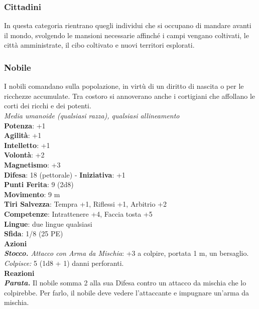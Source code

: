 \begin{multicols}{2}
\subsubsection{Cittadini}

In questa categoria rientrano quegli individui che si occupano di mandare avanti il mondo, svolgendo le mansioni necessarie affinché i campi vengano coltivati, le città amministrate, il cibo coltivato e nuovi territori esplorati.

\subsubsection{Nobile}

I nobili comandano sulla popolazione, in virtù di un diritto di nascita o per le ricchezze accumulate. Tra costoro si annoverano anche i cortigiani che affollano le corti dei ricchi e dei potenti.\\
\emph{Media umanoide (qualsiasi razza), qualsiasi allineamento}\\
\textbf{Potenza}: +1\\
\textbf{Agilità}: +1\\
\textbf{Intelletto}: +1\\
\textbf{Volontà}: +2\\
\textbf{Magnetismo}: +3\\
\textbf{Difesa}: 18 (pettorale) - \textbf{Iniziativa}: +1\\
\textbf{Punti Ferita}: 9 (2d8)\\
\textbf{Movimento}: 9 m\\
\textbf{Tiri Salvezza}: Tempra +1, Riflessi +1, Arbitrio +2 \\
\textbf{Competenze}: Intrattenere +4, Faccia tosta +5\\
\textbf{Lingue}: due lingue qualsiasi\\
\textbf{Sfida}: 1/8 (25 PE)\smallskip\\
\smallskip\textbf{Azioni}\\
\emph{\textbf{Stocco.} Attacco con Arma da Mischia}: +3 a colpire, portata 1 m, un bersaglio.\\
\emph{Colpisce:} 5 (1d8 + 1) danni perforanti.\\
\textbf{Reazioni}\\
\emph{\textbf{Parata.}} Il nobile somma 2 alla sua Difesa contro un attacco da mischia che lo colpirebbe. Per farlo, il nobile deve vedere l'attaccante e impugnare un'arma da mischia.\\


\end{multicols}

